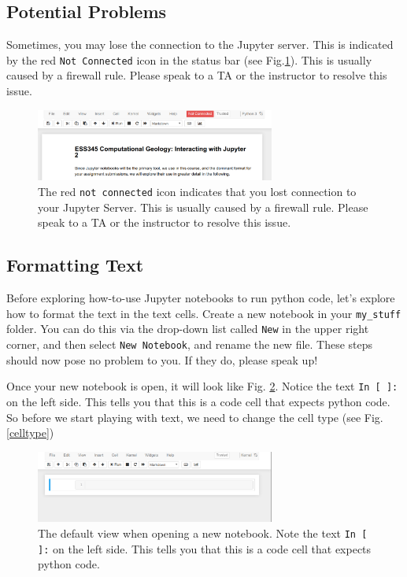 \documentclass[svgnames, 11pt, lettersize]{article}
\begin{document}
\subsection{Potential Problems}
\label{sec:org57bcbae}
Sometimes, you may lose the connection to the Jupyter
server. This is indicated by the red \texttt{Not Connected} icon in the
status bar (see Fig.\ref{noconn}). This is usually caused by a firewall
rule. Please speak to a TA or the instructor to resolve this issue.
\begin{figure}[htbp]
\centering
\includegraphics[width=0.7\textwidth]{./figures/Screenshot_20200527_134756.png}
\caption{\label{noconn}The red \texttt{not connected} icon indicates that you lost connection to your Jupyter Server. This is usually caused by a firewall rule. Please speak to a TA or the instructor to resolve this issue.}
\end{figure}
\subsection{Formatting Text}
\label{sec:orgd06c714}
Before exploring how-to-use Jupyter notebooks to run python code,
let's explore how to format the text in the text cells. Create  a
new notebook in your \texttt{my\_stuff} folder. You can do this via the drop-down list called \texttt{New} in the upper right corner, and then select
\texttt{New Notebook}, and rename the new file. These steps should now pose no
problem to you. If they do, please speak up!

Once your new notebook is open, it will look like
Fig. \ref{nbfirst}. Notice the text \texttt{In [ ]:} on the left side. This
tells you that this is a code cell that expects python code. So before
we start playing with text, we need to change the cell type (see Fig. \ref{celltype})
\begin{figure}[htbp]
\centering
\includegraphics[width=0.7\textwidth]{./figures/Screenshot_20200527_145057.png}
\caption{\label{nbfirst}The default view when opening a new notebook. Note the text \texttt{In [ ]:} on the left side. This tells you that this is a code cell that expects python code.}
\end{figure}
\end{document}
